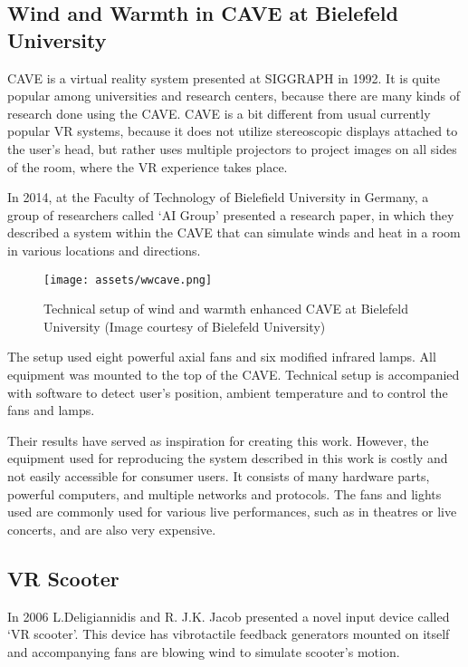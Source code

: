 \hypertarget{x-wind-and-warmth-in-cave-at-bielefeld-university}{\subsection{Wind and Warmth in CAVE at Bielefeld University}}
CAVE is a virtual reality system presented at SIGGRAPH in 1992.
It is quite popular among universities and research centers, because there are
many kinds of research done using the CAVE. CAVE is a bit different from
usual currently popular VR systems, because it does not utilize
stereoscopic displays attached to the user’s head, but rather uses multiple
projectors to project images on all sides of the room, where the
VR experience takes place.


In 2014, at the Faculty of Technology of Bielefield University in Germany,
a group of researchers called `AI Group' presented a research paper, in which
they described a system within the CAVE that can simulate winds
and heat in a room in various locations and directions. \cite{wwcave}

\begin{figure}[h]{}
    \centering\texttt{[image: assets/wwcave.png]}
    \caption{Technical setup of wind and warmth enhanced CAVE at 
    Bielefeld University (Image courtesy of Bielefeld University)}
\end{figure}

The setup used eight powerful axial fans and six modified
infrared lamps. All equipment was mounted to the top of the CAVE. Technical
setup is accompanied with software to detect user's position, ambient
temperature and to control the fans and lamps.

Their results have served as inspiration for creating this work.
However, the equipment used for reproducing the system described in this work
is costly and not easily accessible for consumer users.
It consists of many hardware parts, powerful computers, and multiple
networks and protocols. The fans and lights used are commonly used
for various live performances, such as in theatres or live concerts, and are
also very expensive.


\hypertarget{x-vr-scooter}{\subsection{VR Scooter}}
In 2006 L.Deligiannidis and R. J.K. Jacob presented a novel input device called
`VR scooter'. This device has vibrotactile feedback generators mounted on itself
and accompanying fans are blowing wind to simulate scooter’s motion. \cite{vrscooter}

